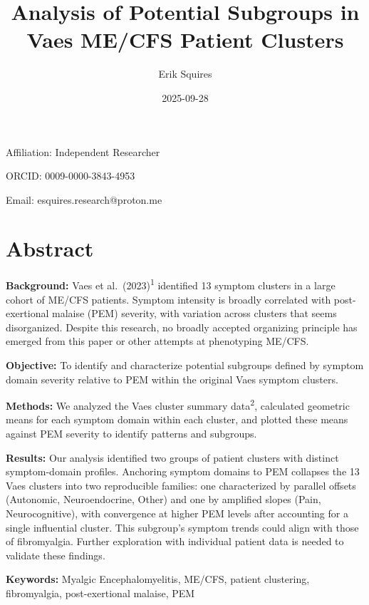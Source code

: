 \documentclass[
  letterpaper,
  DIV=11,
  numbers=noendperiod]{scrartcl}
\title{Analysis of Potential Subgroups in Vaes ME/CFS Patient Clusters}
\author{Erik Squires}
\date{2025-09-28}
\begin{document}
\maketitle


Affiliation: Independent Researcher

ORCID: 0009-0000-3843-4953

Email: esquires.research@proton.me

\section*{Abstract}\label{abstract}

\textbf{Background:} Vaes et al.~(2023)\textsuperscript{1} identified 13
symptom clusters in a large cohort of ME/CFS patients. Symptom intensity
is broadly correlated with post-exertional malaise (PEM) severity, with
variation across clusters that seems disorganized. Despite this
research, no broadly accepted organizing principle has emerged from this
paper or other attempts at phenotyping ME/CFS.

\textbf{Objective:} To identify and characterize potential subgroups
defined by symptom domain severity relative to PEM within the original
Vaes symptom clusters.

\textbf{Methods:} We analyzed the Vaes cluster summary
data\textsuperscript{2}, calculated geometric means for each symptom
domain within each cluster, and plotted these means against PEM severity
to identify patterns and subgroups.

\textbf{Results:} Our analysis identified two groups of patient clusters
with distinct symptom-domain profiles. Anchoring symptom domains to PEM
collapses the 13 Vaes clusters into two reproducible families: one
characterized by parallel offsets (Autonomic, Neuroendocrine, Other) and
one by amplified slopes (Pain, Neurocognitive), with convergence at
higher PEM levels after accounting for a single influential cluster.
This subgroup's symptom trends could align with those of fibromyalgia.
Further exploration with individual patient data is needed to validate
these findings.

\textbf{Keywords:} Myalgic Encephalomyelitis, ME/CFS, patient
clustering, fibromyalgia, post-exertional malaise, PEM

\newpage{}

\setcounter{tocdepth}{2}
\tableofcontents

\newpage{}

\listoffigures
\listoftables
\end{document}
